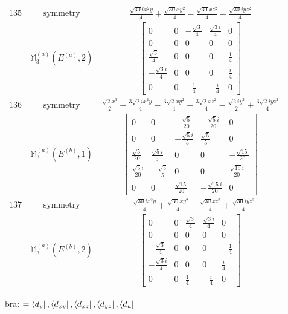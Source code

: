 \documentclass[fleqn,8pt,landscape]{jsarticle}
\begin{document}
\begin{longtable}{ccc}
$ 135 $ & $ \text{symmetry} $ & $ \frac{\sqrt{30} i x^{2} y}{4} + \frac{\sqrt{30} x y^{2}}{4} - \frac{\sqrt{30} x z^{2}}{4} - \frac{\sqrt{30} i y z^{2}}{4} $ \\
$  $ & $ \mathbb{M}_{3}^{(a)}(E^{(a)},2) $ & $ \begin{bmatrix} 0 & 0 & - \frac{\sqrt{3}}{4} & \frac{\sqrt{3} i}{4} & 0 \\ 0 & 0 & 0 & 0 & 0 \\ \frac{\sqrt{3}}{4} & 0 & 0 & 0 & \frac{1}{4} \\ - \frac{\sqrt{3} i}{4} & 0 & 0 & 0 & \frac{i}{4} \\ 0 & 0 & - \frac{1}{4} & - \frac{i}{4} & 0 \end{bmatrix} $ \\ \hline
$ 136 $ & $ \text{symmetry} $ & $ \frac{\sqrt{2} x^{3}}{2} + \frac{3 \sqrt{2} i x^{2} y}{4} - \frac{3 \sqrt{2} x y^{2}}{4} - \frac{3 \sqrt{2} x z^{2}}{4} - \frac{\sqrt{2} i y^{3}}{2} + \frac{3 \sqrt{2} i y z^{2}}{4} $ \\
$  $ & $ \mathbb{M}_{3}^{(a)}(E^{(b)},1) $ & $ \begin{bmatrix} 0 & 0 & - \frac{\sqrt{5}}{20} & - \frac{\sqrt{5} i}{20} & 0 \\ 0 & 0 & - \frac{\sqrt{5} i}{5} & \frac{\sqrt{5}}{5} & 0 \\ \frac{\sqrt{5}}{20} & \frac{\sqrt{5} i}{5} & 0 & 0 & - \frac{\sqrt{15}}{20} \\ \frac{\sqrt{5} i}{20} & - \frac{\sqrt{5}}{5} & 0 & 0 & \frac{\sqrt{15} i}{20} \\ 0 & 0 & \frac{\sqrt{15}}{20} & - \frac{\sqrt{15} i}{20} & 0 \end{bmatrix} $ \\ \hline
$ 137 $ & $ \text{symmetry} $ & $ - \frac{\sqrt{30} i x^{2} y}{4} + \frac{\sqrt{30} x y^{2}}{4} - \frac{\sqrt{30} x z^{2}}{4} + \frac{\sqrt{30} i y z^{2}}{4} $ \\
$  $ & $ \mathbb{M}_{3}^{(a)}(E^{(b)},2) $ & $ \begin{bmatrix} 0 & 0 & \frac{\sqrt{3}}{4} & \frac{\sqrt{3} i}{4} & 0 \\ 0 & 0 & 0 & 0 & 0 \\ - \frac{\sqrt{3}}{4} & 0 & 0 & 0 & - \frac{1}{4} \\ - \frac{\sqrt{3} i}{4} & 0 & 0 & 0 & \frac{i}{4} \\ 0 & 0 & \frac{1}{4} & - \frac{i}{4} & 0 \end{bmatrix} $ \\ \hline
\end{longtable}
bra: $=\bra{d_{v}}, \bra{d_{xy}}, \bra{d_{xz}}, \bra{d_{yz}}, \bra{d_{u}}$
\end{document}
